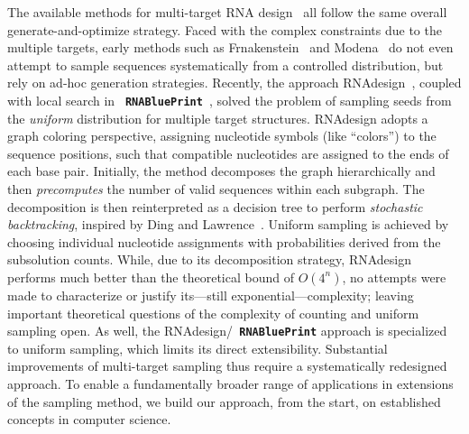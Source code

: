 \documentclass[]{bmcart}
\newcommand{\Def}[1]{\emph{#1}}
\newcommand{\parHead}[1]{\Final{\paragraph{#1}}}
\newcommand{\Final}[1]{\begingroup\color{red!70!black}#1\endgroup}
\renewcommand{\Final}[1]{}
\newcommand{\Nuc}[1]{{\sf #1}}
\newcommand{\Cb}{\Nuc{C}}
\newcommand{\Gb}{\Nuc{G}}
\newcommand{\GCb}{\Gb\Cb}
\newcommand{\Software}[1]{{\ttfamily #1}}
\newcommand{\RNAblueprint}{{\tt \bfseries{}\color{black!85} RNA\textcolor{blue!70!black}{Blue}Print}}
\newcommand{\citep}[1]{\cite{#1}}
\newcommand{\revised}[1]{{\color{red} #1}}
\begin{document}
\parHead{Specificities and similarities of multi-target design.}
The available methods for multi-target RNA design~\citep{Lyngsoe2012,HoenerzuSiederdissen2013,Taneda2015,Hammer2017} all follow the same overall generate-and-optimize strategy.
%
Faced with the complex constraints due to the multiple targets, early methods such as \Software{Frnakenstein}~\citep{Lyngsoe2012} and \Software{Modena}~\citep{Taneda2015} \revised{do not even attempt to sample sequences systematically from a controlled distribution}, but rely on ad-hoc generation strategies.
%
Recently, the approach \Software{RNAdesign}~\citep{HoenerzuSiederdissen2013}, coupled with local
search in \RNAblueprint{}~\citep{Hammer2017}, solved the
problem of sampling seeds from the \emph{uniform} distribution for multiple
target structures. \Software{RNAdesign} adopts a graph coloring perspective,
\revised{assigning nucleotide symbols (like ``colors'') to the sequence positions, such that compatible nucleotides are assigned to the ends of each base pair.} Initially, the method decomposes the graph hierarchically and then \Def{precomputes} the number of valid sequences
within each subgraph. The decomposition is then reinterpreted as a
decision tree to perform \Def{stochastic backtracking}, inspired by
Ding and Lawrence~\citep{Ding2003}. Uniform sampling is achieved by
choosing individual nucleotide assignments with probabilities derived
from the subsolution counts. While, due to its decomposition strategy, 
\Software{RNAdesign} performs much better than the theoretical bound of $O(4^n)$, no attempts were made to characterize or justify its---still exponential---complexity; leaving important theoretical questions of the complexity of counting and uniform sampling open.
As well, the \Software{RNAdesign}/\RNAblueprint{} approach is specialized to uniform sampling, which limits its direct extensibility. \revised{Substantial improvements of multi-target sampling thus require a systematically redesigned approach. To enable a fundamentally broader range of applications in extensions of the sampling method, we build our approach, from the start, on established concepts in computer science.}

%
 
\end{document}
